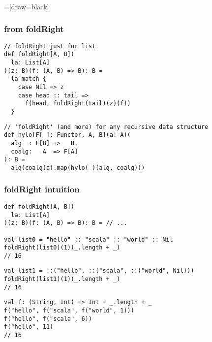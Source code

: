 \documentclass[include/preamble.tex]{subfiles}
\begin{document}
=[draw=black]

\begin{frame}[fragile]
  \frametitle{from foldRight }
  \begin{center}
    \begin{lstlisting}[style=scala]
// foldRight just for list
def foldRight[A, B](
  la: List[A]
)(z: B)(f: (A, B) => B): B =
  la match {
    case Nil => z
    case head :: tail =>
      f(head, foldRight(tail)(z)(f))
  }
    \end{lstlisting}
    \pause
    \begin{lstlisting}[style=scala]
// 'foldRight' (and more) for any recursive data structure
def hylo[F[_]: Functor, A, B](a: A)(
  alg  : F[B] =>   B,
  coalg:   A  => F[A]
): B =
  alg(coalg(a).map(hylo(_)(alg, coalg)))
    \end{lstlisting}
  \end{center}
\end{frame}

\begin{frame}[fragile]
  \frametitle{foldRight intuition}
  \begin{center}
    \begin{lstlisting}[style=scala]
def foldRight[A, B](
  la: List[A]
)(z: B)(f: (A, B) => B): B = // ...

val list0 = "hello" :: "scala" :: "world" :: Nil
foldRight(list0)(1)(_.length + _)
// 16
    \end{lstlisting}
    \pause
    \begin{lstlisting}[style=scala]
val list1 = ::("hello", ::("scala", ::("world", Nil)))
foldRight(list1)(1)(_.length + _)
// 16
    \end{lstlisting}
    \pause
    \begin{lstlisting}[style=scala]
val f: (String, Int) => Int = _.length + _
f("hello", f("scala", f("world", 1)))
f("hello", f("scala", 6))
f("hello", 11)
// 16
    \end{lstlisting}
  \end{center}
\end{frame}
\end{document}

